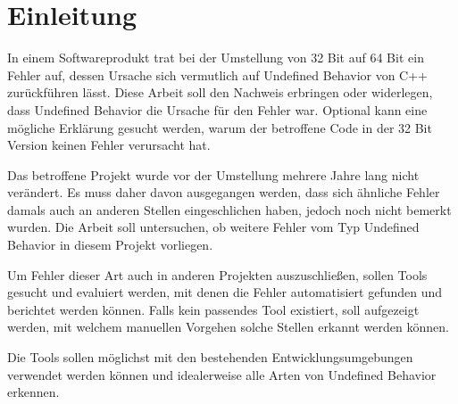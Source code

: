 \chapter{Einleitung}
\label{ch:Einleitung}

In einem Softwareprodukt trat bei der Umstellung von 32 Bit auf 64 Bit ein Fehler auf,
dessen Ursache sich vermutlich auf Undefined Behavior von C++ zurückführen lässt. Diese Arbeit soll den Nachweis erbringen oder widerlegen,
dass Undefined Behavior die Ursache für den Fehler war. Optional kann eine mögliche Erklärung gesucht werden,
warum der betroffene Code in der 32 Bit Version keinen Fehler verursacht hat.

Das betroffene Projekt wurde vor der Umstellung mehrere Jahre lang nicht verändert. Es muss daher davon ausgegangen werden,
dass sich ähnliche Fehler damals auch an anderen Stellen eingeschlichen haben, jedoch noch nicht  bemerkt wurden.
Die Arbeit soll untersuchen, ob weitere Fehler vom Typ Undefined Behavior in diesem Projekt vorliegen.

Um Fehler dieser Art auch in anderen Projekten auszuschließen, sollen Tools gesucht und evaluiert werden,
mit denen die Fehler automatisiert gefunden und berichtet werden können. Falls kein passendes Tool existiert, soll aufgezeigt werden,
mit welchem manuellen Vorgehen solche Stellen erkannt werden können.

Die Tools sollen möglichst mit den bestehenden Entwicklungsumgebungen verwendet werden können und idealerweise alle Arten von
Undefined Behavior erkennen.

